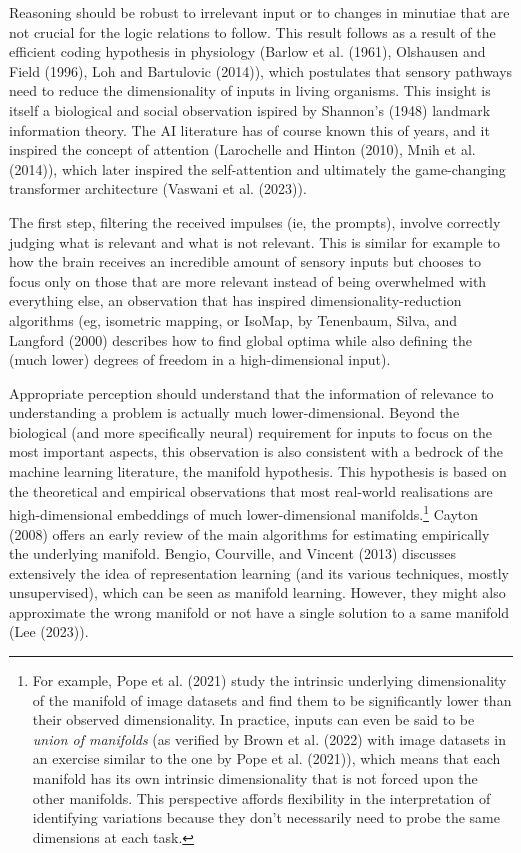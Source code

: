 \documentclass[
]{article}
\begin{document}
Reasoning should be robust to irrelevant input or to changes in minutiae
that are not crucial for the logic relations to follow. This result
follows as a result of the efficient coding hypothesis in physiology
(Barlow et al. (1961), Olshausen and Field (1996), Loh and Bartulovic
(2014)), which postulates that sensory pathways need to reduce the
dimensionality of inputs in living organisms. This insight is itself a
biological and social observation ispired by Shannon's (1948) landmark
information theory. The AI literature has of course known this of years,
and it inspired the concept of attention (Larochelle and Hinton (2010),
Mnih et al. (2014)), which later inspired the self-attention and
ultimately the game-changing transformer architecture (Vaswani et al.
(2023)).

The first step, filtering the received impulses (ie, the prompts),
involve correctly judging what is relevant and what is not relevant.
This is similar for example to how the brain receives an incredible
amount of sensory inputs but chooses to focus only on those that are
more relevant instead of being overwhelmed with everything else, an
observation that has inspired dimensionality-reduction algorithms (eg,
isometric mapping, or IsoMap, by Tenenbaum, Silva, and Langford (2000)
describes how to find global optima while also defining the (much lower)
degrees of freedom in a high-dimensional input).

Appropriate perception should understand that the information of
relevance to understanding a problem is actually much lower-dimensional.
Beyond the biological (and more specifically neural) requirement for
inputs to focus on the most important aspects, this observation is also
consistent with a bedrock of the machine learning literature, the
manifold hypothesis. This hypothesis is based on the theoretical and
empirical observations that most real-world realisations are
high-dimensional embeddings of much lower-dimensional
manifolds.\footnote{For example, Pope et al. (2021) study the intrinsic
  underlying dimensionality of the manifold of image datasets and find
  them to be significantly lower than their observed dimensionality. In
  practice, inputs can even be said to be \emph{union of manifolds} (as
  verified by Brown et al. (2022) with image datasets in an exercise
  similar to the one by Pope et al. (2021)), which means that each
  manifold has its own intrinsic dimensionality that is not forced upon
  the other manifolds. This perspective affords flexibility in the
  interpretation of identifying variations because they don't
  necessarily need to probe the same dimensions at each task.} Cayton
(2008) offers an early review of the main algorithms for estimating
empirically the underlying manifold. Bengio, Courville, and Vincent
(2013) discusses extensively the idea of representation learning (and
its various techniques, mostly unsupervised), which can be seen as
manifold learning. However, they might also approximate the wrong
manifold or not have a single solution to a same manifold (Lee (2023)).
\end{document}
